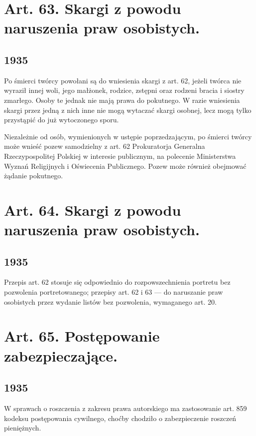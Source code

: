 \documentclass[withmarginpar]{book}
\begin{document}
\section{Art. 63. Skargi z powodu naruszenia praw osobistych.}
\label{sec:art.-63}
\subsection{1935}
\label{sec:art.-63-1}

Po śmierci twórcy powołani są do wniesienia skargi z art. 62, jeżeli
twórca nie wyraził innej woli, jego małżonek, rodzice, zstępni oraz
rodzeni bracia i siostry zmarłego. Osoby te jednak nie mają prawa do
pokutnego. W razie wniesienia skargi przez jedną z nich inne nie mogą
wytaczać skargi osobnej, lecz mogą tylko przystąpić do już wytoczonego
sporu.

Niezależnie od osób, wymienionych w ustępie poprzedzającym, po śmierci
twórcy może wnieść pozew samodzielny z art. 62 Prokuratorja Generalna
Rzeczypospolitej Polskiej w interesie publicznym, na polecenie
Ministerstwa Wyznań Religijnych i Oświecenia Publicznego. Pozew może
również obejmować żądanie pokutnego.

\section{Art. 64. Skargi z powodu naruszenia praw osobistych.}
\label{sec:art.-64}
\subsection{1935}
\label{sec:art.-64-1}

Przepis art. 62 stosuje się odpowiednio do rozpowszechnienia portretu
bez pozwolenia portretowanego; przepisy art. 62 i 63 — do naruszanie
praw osobistych przez wydanie listów bez pozwolenia, wymaganego
art. 20.

\section{Art. 65. Postępowanie zabezpieczające.}
\label{sec:art.-65}
\subsection{1935}
\label{sec:art.-65-1}

W sprawach o roszczenia z zakresu prawa autorskiego ma zastosowanie
art. 859 kodeksu postępowania cywilnego, choćby chodziło o
zabezpieczenie roszczeń pieniężnych.
\end{document}
